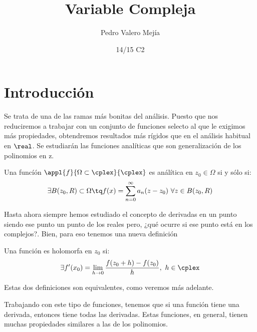 \documentclass{apuntes}
\title{Variable Compleja}
\author{Pedro Valero Mejía}
\date{14/15 C2}
\begin{document}
\pagestyle{plain}
\maketitle

\tableofcontents
\newpage
\chapter{Introducción}
Se trata de una de las ramas más bonitas del análisis. Puesto que nos reduciremos a trabajar con un conjunto de funciones selecto al que le exigimos más propiedades, obtendremos resultados más rígidos que en el análisis habitual en $\real$. Se estudiarán las funciones analíticas que son generalización de los polinomios en z.

\begin{defn}
Una funcíón $\appl{f}{\Omega \subset \cplex}{\cplex}$ es análítica en $z_0\in\Omega$ si y sólo si:
\[\exists B(z_0,R)\subset \Omega \tq f(x)=\sum_{n=0}^{\infty}a_n(z-z_0) \ \forall z \in B(z_0, R)\]
\end{defn}

Hasta ahora siempre hemos estudiado el concepto de derivadas en un punto siendo ese punto un punto de los reales pero, ¿qué ocurre si ese punto está en los complejos?. Bien, para eso tenemos una nueva definición

\begin{defn}
Una función es holomorfa en $z_0$ si:
\[\exists f'(x_0)=\lim_{h \to 0}\frac{f(z_0+h)-f(z_0)}{h}, \ h \in \cplex\]
\end{defn}

Estas dos definiciones son equivalentes, como veremos más adelante.

Trabajando con este tipo de funciones, tenemos que si una función tiene una derivada, entonces tiene todas las derivadas. Estas funciones, en general, tienen muchas propiedades similares a las de los polinomios.
\end{document}
